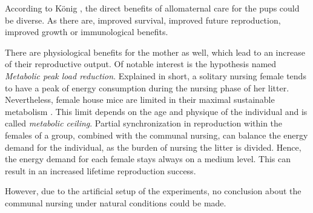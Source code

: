 According to K\"onig \citep{koenig:06}, the direct benefits of allomaternal care for the pups could be diverse. As there are, improved survival, improved future reproduction, improved growth or immunological benefits.

There are physiological benefits for the mother as well, which lead to an increase of their reproductive output. Of notable interest is the hypothesis named \textit{Metabolic peak load reduction}. Explained in short, a solitary nursing female tends to have a peak of energy consumption during the nursing phase of her litter. Nevertheless, female house mice are limited in their maximal sustainable metabolism \citep{hammond:92}. This limit depends on the age and physique of the individual and is called \textit{metabolic ceiling}. Partial synchronization in reproduction within the females of a group, combined with the communal nursing, can balance the energy demand for the individual, as the burden of nursing the litter is divided. Hence, the energy demand for each female stays always on a medium level\citep{koenig:06}. This can result in an increased lifetime reproduction success.

However, due to the artificial setup of the experiments, no conclusion about the communal nursing under natural conditions could be made.
